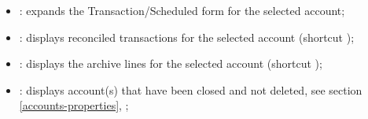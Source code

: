 \vspace{3mm}
\noindent
\begin{minipage}{.7\linewidth}
	\begin{itemize}[rightmargin=.6cm]
	\item {}: expands the Transaction/Scheduled form for the selected account;
	\item {}: displays reconciled transactions for the selected account (shortcut );
	\item {}: displays the archive lines for the selected account (shortcut );
	\item {}: displays account(s) that have been closed and not deleted, see section \vref{accounts-properties}, ; %
	\end{itemize}
\end{minipage}
\hspace{10pt}	
